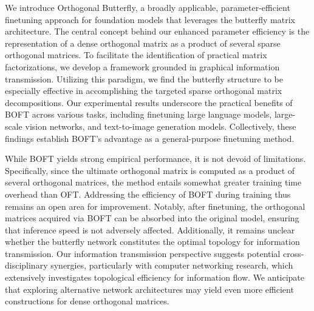 We introduce Orthogonal Butterfly, a broadly applicable, parameter-efficient finetuning approach for foundation models that leverages the butterfly matrix architecture. The central concept behind our enhanced parameter efficiency is the representation of a dense orthogonal matrix as a product of several sparse orthogonal matrices. To facilitate the identification of practical matrix factorizations, we develop a framework grounded in graphical information transmission. Utilizing this paradigm, we find the butterfly structure to be especially effective in accomplishing the targeted sparse orthogonal matrix decompositions. Our experimental results underscore the practical benefits of BOFT across various tasks, including finetuning large language models, large-scale vision networks, and text-to-image generation models. Collectively, these findings establish BOFT’s advantage as a general-purpose finetuning method.

While BOFT yields strong empirical performance, it is not devoid of limitations. Specifically, since the ultimate orthogonal matrix is computed as a product of several orthogonal matrices, the method entails somewhat greater training time overhead than OFT. Addressing the efficiency of BOFT during training thus remains an open area for improvement. Notably, after finetuning, the orthogonal matrices acquired via BOFT can be absorbed into the original model, ensuring that inference speed is not adversely affected. Additionally, it remains unclear whether the butterfly network constitutes the optimal topology for information transmission. Our information transmission perspective suggests potential cross-disciplinary synergies, particularly with computer networking research, which extensively investigates topological efficiency for information flow. We anticipate that exploring alternative network architectures may yield even more efficient constructions for dense orthogonal matrices.